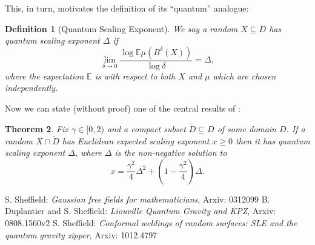 \documentclass[11pt,reqno]{amsart}
\numberwithin{equation}{section}
\newtheorem{thm}{Theorem}[section]
\newtheorem{defi}[thm]{Definition}
\begin{document}
This, in turn, motivates the definition of its ``quantum'' analogue:
\begin{defi}[Quantum Scaling Exponent]
	We say a random $X\subseteq D$ has quantum scaling exponent $\Delta$ if $$\lim_{\delta\rightarrow 0}\frac{\log\mathbb E\mu(B^\delta(X))}{\log\delta}=\Delta,$$
	where the expectation $\mathbb E$ is with respect to both $X$ and $\mu$ which are chosen independently.
\end{defi}

Now we can state (without proof) one of the central results of \cite{Dup10}:

\begin{thm}
	Fix $\gamma\in[0,2)$ and a compact subset $\tilde D\subseteq D$ of some domain $D$. If a random $X\cap\tilde D$ has Euclidean expected scaling exponent $x\geq 0$ then it has quantum scaling exponent $\Delta$, where $\Delta$ is the non-negative solution to $$x=\frac{\gamma^2}{4}\Delta^2+\left(1-\frac{\gamma^2}{4}\right)\Delta.$$
\end{thm}


\begin{thebibliography}{00}
 S. Sheffield: \emph{Gaussian free fields for mathematicians}, Arxiv: 0312099
 B. Duplantier and S. Sheffield: \emph{Liouville Quantum Gravity and KPZ}, Arxiv: 0808.1560v2
 S. Sheffield: \emph{Conformal weldings of random surfaces: SLE and the quantum gravity zipper}, Arxiv: 1012.4797
\end{thebibliography}
\end{document}
